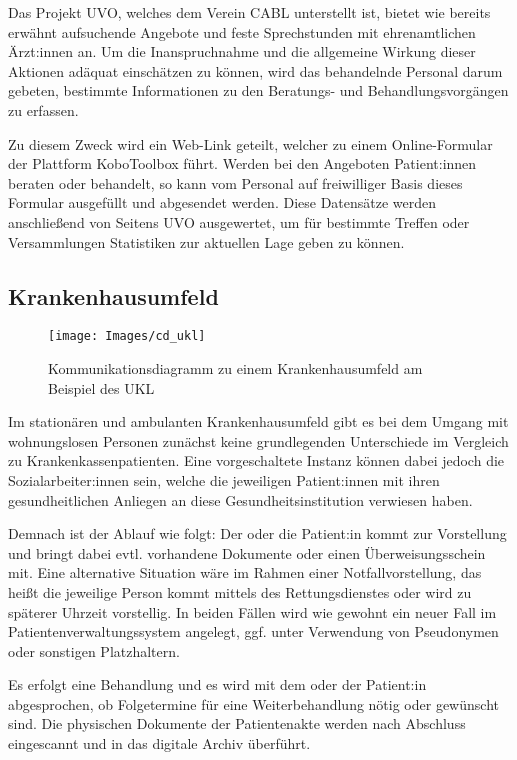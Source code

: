 Das Projekt \ac{UVO}, welches dem Verein \ac{CABL} unterstellt ist, bietet wie bereits erwähnt aufsuchende Angebote und feste Sprechstunden mit ehrenamtlichen Ärzt:innen an. Um die Inanspruchnahme und die allgemeine Wirkung dieser Aktionen adäquat einschätzen zu können, wird das behandelnde Personal darum gebeten, bestimmte Informationen zu den Beratungs- und Behandlungsvorgängen zu erfassen.

Zu diesem Zweck wird ein Web-Link geteilt, welcher zu einem Online-Formular der Plattform KoboToolbox führt. Werden bei den Angeboten Patient:innen beraten oder behandelt, so kann vom Personal auf freiwilliger Basis dieses Formular ausgefüllt und abgesendet werden. Diese Datensätze werden anschließend von Seitens \ac{UVO} ausgewertet, um für bestimmte Treffen oder Versammlungen Statistiken zur aktuellen Lage geben zu können.

\subsection{Krankenhausumfeld}\label{sub:ukl}

\begin{figure}[h]
	\centering
	\texttt{[image: Images/cd\_ukl]}
	\caption[Kommunikationsdiagramm UKL]{Kommunikationsdiagramm zu einem Krankenhausumfeld am Beispiel des UKL}
	\label{fig:cdUKL}
\end{figure}

Im stationären und ambulanten Krankenhausumfeld gibt es bei dem Umgang mit wohnungslosen Personen zunächst keine grundlegenden Unterschiede im Vergleich zu Krankenkassenpatienten. Eine vorgeschaltete Instanz können dabei jedoch die Sozialarbeiter:innen sein, welche die jeweiligen Patient:innen mit ihren gesundheitlichen Anliegen an diese Gesundheitsinstitution verwiesen haben.

Demnach ist der Ablauf wie folgt: Der oder die Patient:in kommt zur Vorstellung und bringt dabei evtl. vorhandene Dokumente oder einen Überweisungsschein mit. Eine alternative Situation wäre im Rahmen einer Notfallvorstellung, das heißt die jeweilige Person kommt mittels des Rettungsdienstes oder wird zu späterer Uhrzeit vorstellig. In beiden Fällen wird wie gewohnt ein neuer Fall im Patientenverwaltungssystem angelegt, ggf. unter Verwendung von Pseudonymen oder sonstigen Platzhaltern.

Es erfolgt eine Behandlung und es wird mit dem oder der Patient:in abgesprochen, ob Folgetermine für eine Weiterbehandlung nötig oder gewünscht sind. Die physischen Dokumente der Patientenakte werden nach Abschluss eingescannt und in das digitale Archiv überführt. 

